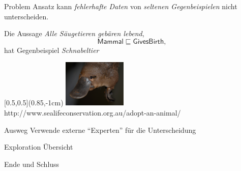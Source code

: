 \documentclass[ngerman]{beamer}
\begin{document}
\begin{frame}

  \onslide<+->

  \begin{block}{Problem}
    Ansatz kann \emph{fehlerhafte Daten} von \emph{seltenen Gegenbeispielen} nicht
    unterscheiden.
  \end{block}

  \onslide<+->

  \begin{Beispiel}
    Die Aussage \emph{Alle Säugetieren gebären lebend},
    \begin{equation*}
      \mathsf{Mammal} \sqsubseteq \mathsf{GivesBirth},
    \end{equation*}
    \onslide<+->
    hat Gegenbeispiel \emph{Schnabeltier}
  
    \begin{textblock*}{\linewidth}[0.5,0.5](0.85\linewidth,-1cm)
      \centering
      \includegraphics[width=3cm]{platypus}\\[-2ex]
      {\fontsize{3pt}{4pt}\selectfont http://www.sealifeconservation.org.au/adopt-an-animal/}
    \end{textblock*}

  \end{Beispiel}

  \onslide<+->

  \begin{block}{Ausweg}
    Verwende externe \enquote{Experten} für die Unterscheidung
  \end{block}

\end{frame}

\begin{frame}
  Exploration Übersicht
\end{frame}

\begin{frame}
  Ende und Schluss
\end{frame}
\end{document}
